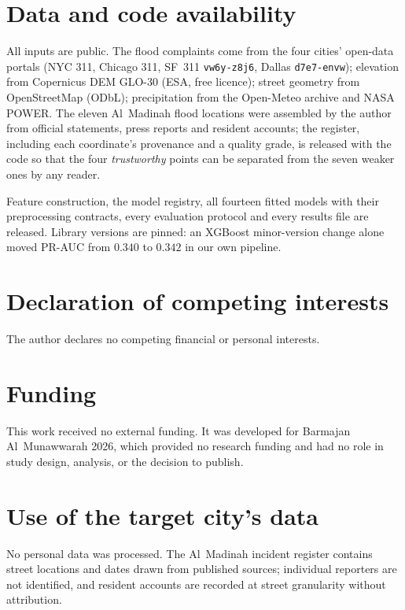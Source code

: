 \documentclass[11pt]{article}
\begin{document}
\section*{Data and code availability}
All inputs are public. The flood complaints come from the four cities' open-data
portals (NYC 311, Chicago 311, SF~311 \texttt{vw6y-z8j6}, Dallas
\texttt{d7e7-envw}); elevation from Copernicus DEM GLO-30 (ESA, free licence);
street geometry from OpenStreetMap (ODbL); precipitation from the Open-Meteo
archive and NASA POWER. The eleven Al~Madinah flood locations were assembled by
the author from official statements, press reports and resident accounts; the
register, including each coordinate's provenance and a quality grade, is released
with the code so that the four \emph{trustworthy} points can be separated from
the seven weaker ones by any reader.

Feature construction, the model registry, all fourteen fitted models with their
preprocessing contracts, every evaluation protocol and every results file are
released. Library versions are pinned: an XGBoost minor-version change alone
moved PR-AUC from $0.340$ to $0.342$ in our own pipeline.

\section*{Declaration of competing interests}
The author declares no competing financial or personal interests.

\section*{Funding}
This work received no external funding. It was developed for Barmajan
Al~Munawwarah 2026, which provided no research funding and had no role in study
design, analysis, or the decision to publish.

\section*{Use of the target city's data}
No personal data was processed. The Al~Madinah incident register contains street
locations and dates drawn from published sources; individual reporters are not
identified, and resident accounts are recorded at street granularity without
attribution.



\end{document}
